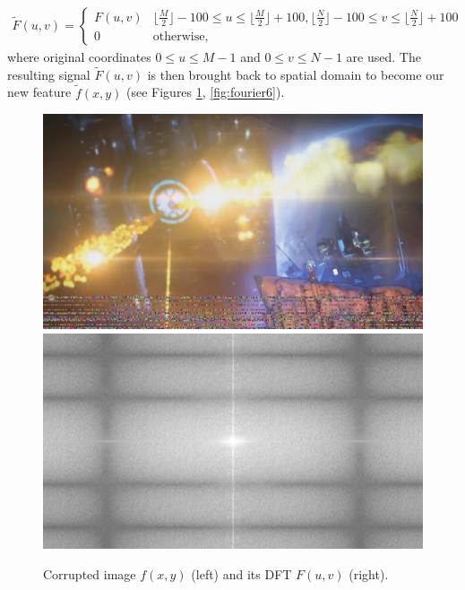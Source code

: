 \begin{align}
\widetilde{F}(u,v)=\begin{cases} 
      F(u,v) & \lfloor\frac{M}{2}\rfloor-100\leqslant u\leqslant \lfloor\frac{M}{2}\rfloor+100, \lfloor\frac{N}{2}\rfloor-100\leqslant v\leqslant \lfloor\frac{N}{2}\rfloor+100 \\
      0 & \text{otherwise},
   \end{cases}
\end{align}
where original coordinates $0\leqslant u\leqslant M-1$ and $0\leqslant v\leqslant N-1$ are used. The resulting signal $\widetilde{F}(u,v)$ is then brought back to spatial domain to become our new feature $\widetilde{f}(x,y)$  (see Figures \ref{fig:fourier5}, \ref{fig:fourier6}).
\begin{figure}[H]
\includegraphics[scale=0.11]{images/pixelationv1.png}
\includegraphics[scale=0.11]{images/pixv1-ft.png}\\
\caption[Fourier transform on stuttering artifact]{Corrupted image $f(x,y)$ (left) and its DFT $F(u,v)$ (right).}
\label{fig:fourier5}
\end{figure}
